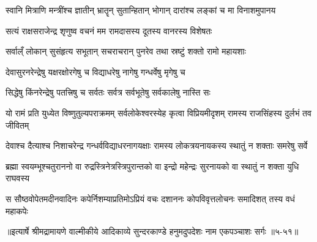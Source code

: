 \twolineshloka
{स्वानि मित्राणि मन्त्रींश्च ज्ञातीन् भ्रातॄन् सुतान्हितान्}
{भोगान् दारांश्च लङ्कां च मा विनाशमुपानय} %

\twolineshloka
{सत्यं राक्षसराजेन्द्र शृणुष्व वचनं मम}
{रामदासस्य दूतस्य वानरस्य विशेषतः} %

\twolineshloka
{सर्वाल्ँ लोकान् सुसंहृत्य सभूतान् सचराचरान्}
{पुनरेव तथा स्रष्टुं शक्तो रामो महायशाः} %

\twolineshloka
{देवासुरनरेन्द्रेषु यक्षरक्षोरगेषु च}
{विद्याधरेषु नागेषु गन्धर्वेषु मृगेषु च} %

\twolineshloka
{सिद्धेषु किंनरेन्द्रेषु पतत्त्रिषु च सर्वतः}
{सर्वत्र सर्वभूतेषु सर्वकालेषु नास्ति सः} %

\threelineshloka
{यो रामं प्रति युध्येत विष्णुतुल्यपराक्रमम्}
{सर्वलोकेश्वरस्येह कृत्वा विप्रियमीदृशम्}
{रामस्य राजसिंहस्य दुर्लभं तव जीवितम्} %

\twolineshloka
{देवाश्च दैत्याश्च निशाचरेन्द्र गन्धर्वविद्याधरनागयक्षाः}
{रामस्य लोकत्रयनायकस्य स्थातुं न शक्ताः समरेषु सर्वे} %

\twolineshloka
{ब्रह्मा स्वयम्भूश्चतुराननो वा रुद्रस्त्रिनेत्रस्त्रिपुरान्तको वा}
{इन्द्रो महेन्द्रः सुरनायको वा स्थातुं न शक्ता युधि राघवस्य} %

\twolineshloka
{स सौष्ठवोपेतमदीनवादिनः कपेर्निशम्याप्रतिमोऽप्रियं वचः}
{दशाननः कोपविवृत्तलोचनः समादिशत् तस्य वधं महाकपेः} %


॥इत्यार्षे श्रीमद्रामायणे वाल्मीकीये आदिकाव्ये सुन्दरकाण्डे हनुमदुपदेशः नाम एकपञ्चाशः सर्गः ॥५-५१॥
